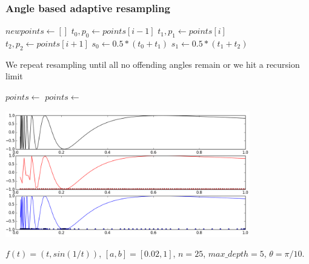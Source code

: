 \documentclass{beamer}
\begin{document}
\frametitle{Angle based adaptive resampling}
\begin{frame}
\footnotesize
\begin{algorithmic}[1]
\State $newpoints \gets []$
\State $t_0, p_0 \gets points[i-1]$
\State $t_1, p_1 \gets points[i]$
\State $t_2, p_2 \gets points[i+1]$
\State $s_0 \gets 0.5*(t_0 + t_1)$
\State $s_1 \gets 0.5*(t_1 + t_2)$
\State {}
\State {}
\State {}
\State {}
\EndIf
\EndFor
\State \Return {}
\EndFunction
\end{algorithmic}
\normalsize
\end{frame}

\begin{frame}
We repeat resampling until all no offending angles remain or we hit a recursion limit
\footnotesize
\begin{algorithmic}[1]
\State $points \gets$ 
\State $points \gets $
\EndFor
\end{algorithmic} \vspace{-0.3cm}
\pause
\begin{center}
\includegraphics[width=0.8\textwidth]{comparison.png} \\
\end{center}
$f(t) = (t, sin(1/t))$, $[a,b] = [0.02, 1]$, $n = 25$, $max\_depth = 5$, $\theta = \pi / 10$.
\normalsize
\end{frame}
\end{document}
